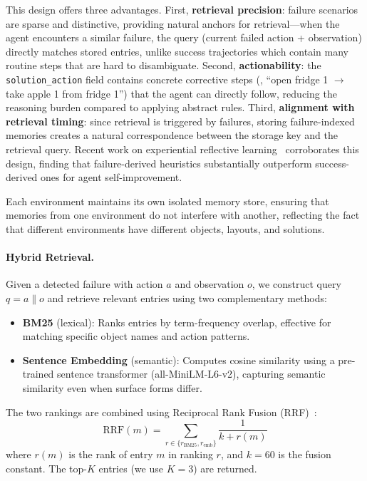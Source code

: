 This design offers three advantages. First, \textbf{retrieval precision}: failure scenarios are sparse and distinctive, providing natural anchors for retrieval---when the agent encounters a similar failure, the query (current failed action + observation) directly matches stored entries, unlike success trajectories which contain many routine steps that are hard to disambiguate. Second, \textbf{actionability}: the \texttt{solution\_action} field contains concrete corrective steps (\eg, ``open fridge 1 $\to$ take apple 1 from fridge 1'') that the agent can directly follow, reducing the reasoning burden compared to applying abstract rules. Third, \textbf{alignment with retrieval timing}: since retrieval is triggered by failures, storing failure-indexed memories creates a natural correspondence between the storage key and the retrieval query. Recent work on experiential reflective learning~\citep{chen2026erl} corroborates this design, finding that failure-derived heuristics substantially outperform success-derived ones for agent self-improvement.

Each environment maintains its own isolated memory store, ensuring that memories from one environment do not interfere with another, reflecting the fact that different environments have different objects, layouts, and solutions.

\paragraph{Hybrid Retrieval.} Given a detected failure with action $a$ and observation $o$, we construct query $q = a \| o$ and retrieve relevant entries using two complementary methods:

\begin{itemize}
    \item \textbf{BM25} (lexical): Ranks entries by term-frequency overlap, effective for matching specific object names and action patterns.
    \item \textbf{Sentence Embedding} (semantic): Computes cosine similarity using a pre-trained sentence transformer (all-MiniLM-L6-v2), capturing semantic similarity even when surface forms differ.
\end{itemize}

The two rankings are combined using Reciprocal Rank Fusion (RRF)~\citep{cormack2009reciprocal}:
\begin{equation}
    \text{RRF}(m) = \sum_{r \in \{r_{\text{BM25}}, r_{\text{emb}}\}} \frac{1}{k + r(m)}
\end{equation}
where $r(m)$ is the rank of entry $m$ in ranking $r$, and $k=60$ is the fusion constant. The top-$K$ entries (we use $K=3$) are returned.

